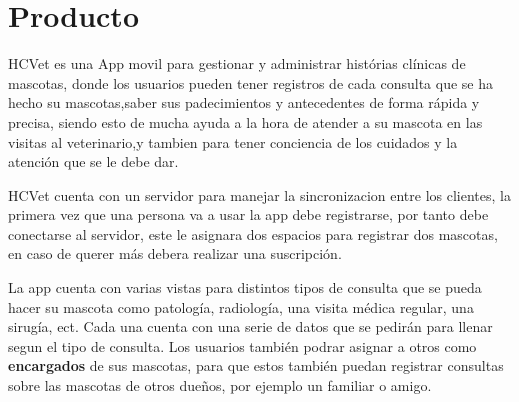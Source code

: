 \chapter{Producto}\label{chapter:proposal}
HCVet es una App movil para gestionar y administrar histórias clínicas de mascotas, donde los usuarios pueden tener registros de cada consulta que se ha hecho su mascotas,saber sus padecimientos y antecedentes de forma rápida y precisa, siendo esto de mucha ayuda a la hora de atender a su mascota en las visitas al veterinario,y tambien para tener conciencia de los cuidados y la atención que se le debe dar.

HCVet cuenta con un servidor para manejar la sincronizacion entre los clientes, la primera vez que una persona va a usar la app debe registrarse, por tanto debe conectarse al servidor, este le asignara dos espacios para registrar dos mascotas, en caso de querer más debera realizar una suscripción.

La app cuenta con varias vistas para distintos tipos de consulta que se pueda hacer su mascota como patología, radiología, una visita médica regular, una sirugía, ect. Cada una cuenta con una serie de datos que se pedirán para llenar segun el tipo de consulta. Los usuarios también podrar asignar a otros como \textbf{encargados} de sus mascotas, para que estos también puedan registrar consultas sobre  las mascotas de otros dueños, por ejemplo un familiar o amigo.

